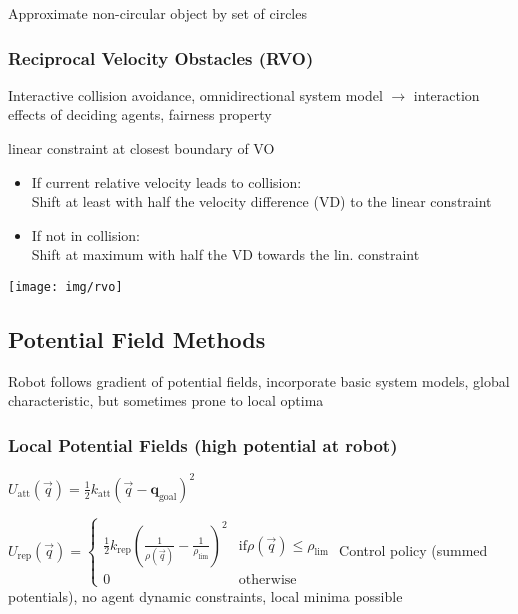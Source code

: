 \documentclass[fontsize=6pt]{scrartcl}
\begin{document}
\begin{multicols*}{4}
Approximate non-circular object by set of circles

\subsubsection*{Reciprocal Velocity Obstacles (RVO)}
Interactive collision avoidance, omnidirectional system model $\rightarrow$ interaction effects of deciding agents, fairness property

\begin{minipage}{0.65\linewidth}
linear constraint at closest boundary of VO

\begin{itemize}
	\item If current relative velocity leads to collision:\\
	Shift at least with half the velocity difference (VD) to the linear constraint
	\item If not in collision:\\
	Shift at maximum with half the VD towards the lin. constraint
\end{itemize}

\end{minipage}
\begin{minipage}{0.34\linewidth}
		\texttt{[image: img/rvo]}
\end{minipage}

\subsection*{Potential Field Methods}

Robot follows gradient of potential fields, incorporate basic system models, global characteristic, but sometimes prone to local optima

\subsubsection*{Local Potential Fields (high potential at robot)}

$
U_\mathrm{att}(\vec q)
=
\frac{1}{2} k_\mathrm{att}(\vec q - \mathbf q_\mathrm{goal})^2$

$
U_\mathrm{rep}(\vec q)
=
\begin{cases}
\frac{1}{2} k_\mathrm{rep} \left(\frac{1}{\rho(\vec q)}
- \frac{1}{\rho_\mathrm{lim}}\right)^2& \mathrm{if } \rho(\vec q) \leq \rho_\mathrm{lim}\\
0 & \mathrm{otherwise}
\end{cases}
$
Control policy (summed potentials), no agent dynamic constraints, local minima possible


\end{multicols*}
\end{document}
